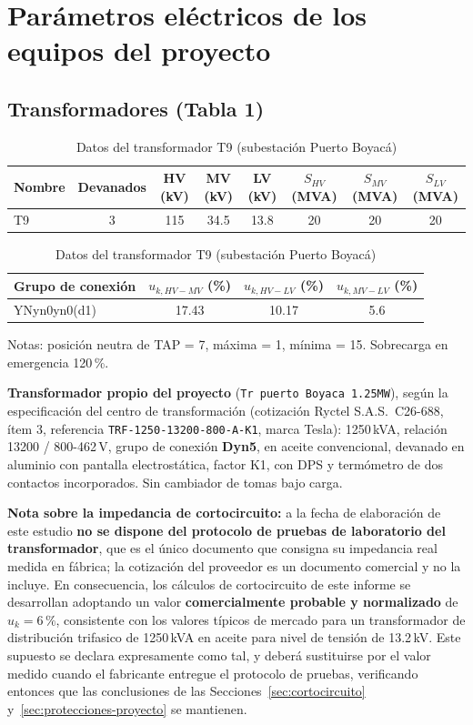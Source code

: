 \documentclass[11pt,a4paper]{article}
\begin{document}
\section{Par\'ametros el\'ectricos de los equipos del proyecto}
\label{sec:parametros}

\subsection{Transformadores (Tabla 1)}
\begin{table}[H]
\centering
\caption{Datos del transformador T9 (subestaci\'on Puerto Boyac\'a)}
\begin{tabular}{lccccccc}
\toprule
Nombre & Devanados & HV (kV) & MV (kV) & LV (kV) & $S_{HV}$ (MVA) & $S_{MV}$ (MVA) & $S_{LV}$ (MVA) \\
\midrule
T9 & 3 & 115 & 34.5 & 13.8 & 20 & 20 & 20 \\
\bottomrule
\end{tabular}

\vspace{0.5em}
\begin{tabular}{lccc}
\toprule
Grupo de conexi\'on & $u_{k,HV-MV}$ (\%) & $u_{k,HV-LV}$ (\%) & $u_{k,MV-LV}$ (\%) \\
\midrule
YNyn0yn0(d1) & 17.43 & 10.17 & 5.6 \\
\bottomrule
\end{tabular}
\vspace{0.3em}

\small Notas: posici\'on neutra de TAP = 7, m\'axima = 1, m\'inima = 15. Sobrecarga en emergencia 120\,\%.
\end{table}

\textbf{Transformador propio del proyecto} (\texttt{Tr puerto Boyaca 1.25MW}), seg\'un la especificaci\'on del centro de transformaci\'on (cotizaci\'on Ryctel S.A.S.\ C26-688, \'item 3, referencia \texttt{TRF-1250-13200-800-A-K1}, marca Tesla): 1250\,kVA, relaci\'on 13200 / 800-462\,V, grupo de conexi\'on \textbf{Dyn5}, en aceite convencional, devanado en aluminio con pantalla electrost\'atica, factor K1, con DPS y term\'ometro de dos contactos incorporados. Sin cambiador de tomas bajo carga.

\textbf{Nota sobre la impedancia de cortocircuito:} a la fecha de elaboraci\'on de este estudio \textbf{no se dispone del protocolo de pruebas de laboratorio del transformador}, que es el \'unico documento que consigna su impedancia real medida en f\'abrica; la cotizaci\'on del proveedor es un documento comercial y no la incluye. En consecuencia, los c\'alculos de cortocircuito de este informe se desarrollan adoptando un valor \textbf{comercialmente probable y normalizado} de $u_k = 6\,\%$, consistente con los valores t\'ipicos de mercado para un transformador de distribuci\'on trifasico de 1250\,kVA en aceite para nivel de tensi\'on de 13.2\,kV. Este supuesto se declara expresamente como tal, y deber\'a sustituirse por el valor medido cuando el fabricante entregue el protocolo de pruebas, verificando entonces que las conclusiones de las Secciones~\ref{sec:cortocircuito} y~\ref{sec:protecciones-proyecto} se mantienen.
\end{document}
